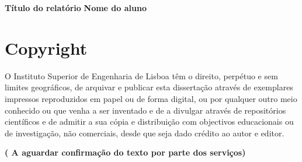 \begin{center}
\Large  \expandafter{\bf Título do relatório}
\vskip1.0in
\large {\bf Nome do aluno} \\
\end{center}

\section*{Copyright}


O Instituto Superior de Engenharia de Lisboa têm o
direito, perpétuo e sem limites geográficos, de arquivar e publicar esta
dissertação através de exemplares impressos reproduzidos em papel ou de forma
digital, ou por qualquer outro meio conhecido ou que venha a ser inventado e de
a divulgar através de repositórios científicos e de admitir a sua cópia e distribuição com
objectivos educacionais ou de investigação, não comerciais, desde que
seja dado crédito ao autor e editor.


 {\bf ( A aguardar confirmação do texto por parte dos serviços)}
